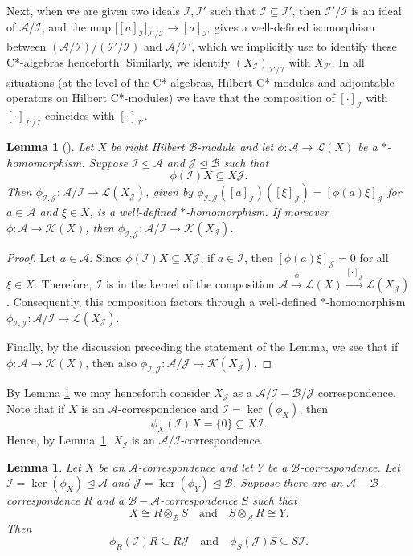 \documentclass[11pt, letterpaper,final]{amsart}
\newcommand{\A}{{\mathcal{A}}}
\newcommand{\B}{{\mathcal{B}}}
\newcommand{\I}{{\mathcal{I}}}
\newcommand{\J}{{\mathcal{J}}}
\newcommand{\K}{{\mathcal{K}}}
\renewcommand{\L}{{\mathcal{L}}}
\newtheorem{lem}[thm]{Lemma}
\theoremstyle{definition}
\begin{document}
Next, when we are given two ideals $\I,\I'$ such that $\I \subseteq \I'$, then $\I'/\I$ is an ideal of $\A / \I$, and the map $\big[ [a]_{\I} \big]_{\I'/\I} \rightarrow [a]_{\I'}$ gives a well-defined isomorphism between $(\A/\I)/ (\I'/\I)$ and $\A / \I'$, which we implicitly use to identify these C*-algebras henceforth. Similarly, we identify $(X_{\I})_{\I'/\I}$ with $X_{\I'}$. In all situations (at the level of the C*-algebras, Hilbert C*-modules and adjointable operators on Hilbert C*-modules) we have that the composition of $[\cdot]_{\I}$ with $[\cdot]_{\I'/\I}$ coincides with $[\cdot]_{\I'}$. 


\begin{lem}[{\cite[Lemma~2.3]{FMR-IUMJ2003}}]\label{lem:quot-correspondence}
Let $X$ be right Hilbert $\B$-module and let $\phi \colon \A \to \L(X)$ be a $*$-homomorphism.  Suppose $\I \unlhd \A$ and $\J \unlhd \B$ such that 
$$\phi(\I)X \subseteq X\J.$$
Then $\phi_{\I, \J} \colon \A/\I \to \L(X_\J)$, given by $\phi_{\I,\J} ( [a]_{\I}) ([\xi]_{\J}) = [\phi(a)\xi]_{\J}$ for $a\in \A$ and $\xi \in X$, is a well-defined $*$-homomorphism. If moreover $\phi: \A \rightarrow \K(X)$, then $\phi_{\I,\J} : \A/\I \rightarrow \K(X_{\J})$.
\end{lem}

\begin{proof}
  Let $a \in \A$. Since $\phi(\I) X \subseteq X\J$, if $a \in \I$, then $[\phi(a) \xi]_{\J} = 0$ for all $\xi\in X$.  Therefore, $\I$ is in the kernel of the composition $\A\xrightarrow{\phi}\L(X)\xrightarrow{[\cdot]_\J} \L(X_\J)$. Consequently, this composition factors through a well-defined $*$-homomorphism $\phi_{\I, \J} \colon \A/\I \to \L(X_\J)$.
	
Finally, by the discussion preceding the statement of the Lemma, we see that if $\phi : \A \rightarrow \K(X)$, then also $\phi_{\I,\J} : \A / \J \rightarrow \K(X_{\J})$.
\end{proof}

By Lemma \ref{lem:quot-correspondence} we may henceforth consider $X_{\J}$ as a $\A/ \I - \B / \J$ correspondence. Note that if $X$ is an $\A$-correspondence and $\I = \ker(\phi_X)$, then 
$$
\phi_X(\I) X = \{0\} \subseteq X\I.
$$
Hence, by Lemma~\ref{lem:quot-correspondence}, $X_\I$ is an $\A/\I$-correspondence.


\begin{lem}\label{lem:compatible-condition}
Let $X$ be an $\A$-correspondence and let $Y$ be a $\B$-correspondence. Let $\I = \ker( \phi_X) \unlhd \A$ and $\J = \ker( \phi_Y) \unlhd \B$. 
 Suppose there are an $\A-\B$-correspondence $R$ and a $\B-\A$-correspondence $S$ such that 
$$X \cong R \otimes_{\B} S \quad \text{and} \quad S \otimes_{\A} R \cong Y.$$
Then 
$$
\phi_R(\I)R \subseteq R\J \quad \text{and} \quad \phi_S(\J) S \subseteq S\I.
$$
\end{lem}
\end{document}
